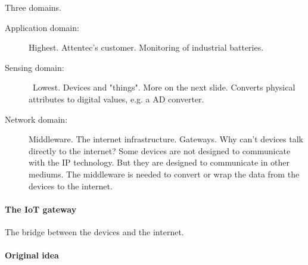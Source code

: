 \documentclass{memoir}
\begin{document}
Three domains.

\begin{description}
    \item[Application domain:] Highest. Attentec's customer. Monitoring of industrial
        batteries.
    \item[Sensing domain:] Lowest. Devices and "things". More on the next
        slide. Converts physical attributes to digital values, e.g. a AD
        converter.
    \item[Network domain:] Middleware. The internet infrastructure. Gateways.
        Why can't devices talk directly to the internet? Some devices are not
        designed to communicate with the IP technology. But they are designed
        to communicate in other mediums. The middleware is needed to convert or
        wrap the data from the devices to the internet.
\end{description}

%
%
%
%

\paragraph{The IoT gateway}

The bridge between the devices and the internet.

\paragraph{Original idea}
\end{document}
